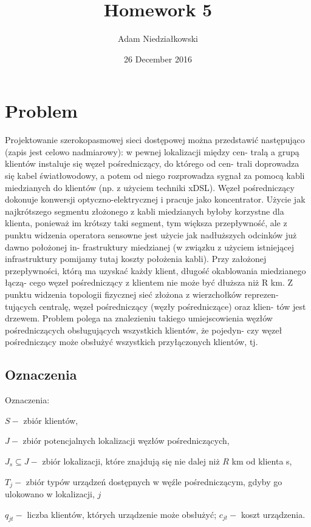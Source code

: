 \documentclass{article}
\title{Homework 5}
\author{Adam Niedziałkowski}
\date{26 December 2016}
\begin{document}
\maketitle

\section{Problem}
Projektowanie szerokopasmowej sieci dostępowej można przedstawić następująco
(zapis jest celowo nadmiarowy): w pewnej lokalizacji między cen-
tralą a grupą klientów instaluje się węzeł pośredniczący, do którego od cen-
trali doprowadza się kabel światłowodowy, a potem od niego rozprowadza
sygnał za pomocą kabli miedzianych do klientów (np. z użyciem techniki
xDSL).  Węzeł  pośredniczący  dokonuje  konwersji  optyczno-elektrycznej  i
pracuje  jako  koncentrator.  Użycie  jak  najkrótszego  segmentu  złożonego
z  kabli  miedzianych  byłoby  korzystne  dla  klienta,  ponieważ  im  krótszy
taki segment, tym większa przepływność, ale z punktu widzenia operatora
sensowne jest użycie jak nadłuższych odcinków już dawno położonej in-
frastruktury  miedzianej  (w  związku  z  użyciem  istniejącej  infrastruktury
pomijamy  tutaj  koszty  położenia  kabli).  Przy  założonej  przepływności,
którą ma uzyskać każdy klient, długość okablowania miedzianego łączą-
cego  węzeł  pośredniczący  z  klientem  nie  może  być  dłuższa  niż R km.
Z punktu widzenia topologii fizycznej sieć złożona z wierzchołków reprezen-
tujących centralę, węzeł pośredniczący (węzły pośredniczące) oraz klien-
tów jest drzewem. Problem polega na znalezieniu takiego umiejscowienia
węzłów pośredniczących obsługujących wszystkich klientów, że pojedyn-
czy  węzeł  pośredniczący  może  obsłużyć  wszystkich  przyłączonych  klientów,
tj.
\subsection{Oznaczenia}
Oznaczenia:

$S - $ zbiór klientów,

$J - $ zbiór potencjalnych lokalizacji węzłów pośredniczących,

$J_s\subseteq J - $ zbiór lokalizacji, które znajdują się nie dalej niż $R$ km od klienta s,

$T_j - $ zbiór typów urządzeń dostępnych w węźle pośredniczącym, gdyby go ulokowano w lokalizacji, $j$

$q_{jt} - $ liczba klientów, których urządzenie może obsłużyć;
$c_{jt} - $ koszt urządzenia.
\end{document}
